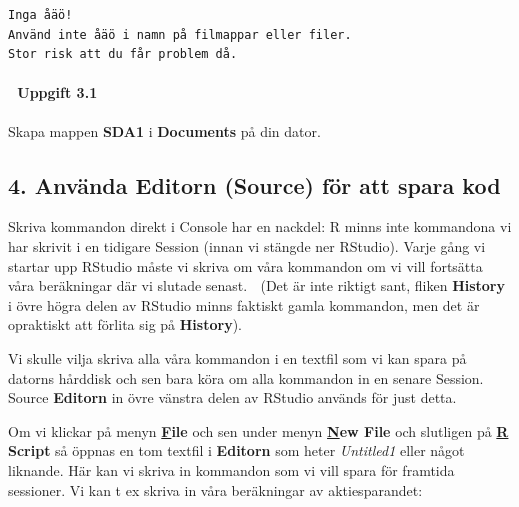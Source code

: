 \documentclass[
  letterpaper,
  DIV=11,
  numbers=noendperiod,
  oneside]{scrartcl}
\let\oldparagraph\paragraph
\renewcommand{\paragraph}[1]{\oldparagraph{#1}\mbox{}}
\begin{document}
\begin{tcolorbox}[enhanced jigsaw, left=2mm, opacityback=0, toprule=.15mm, titlerule=0mm, colframe=quarto-callout-warning-color-frame, rightrule=.15mm, colbacktitle=quarto-callout-warning-color!10!white, toptitle=1mm, leftrule=.75mm, coltitle=black, title=\textcolor{quarto-callout-warning-color}{\faExclamationTriangle}\hspace{0.5em}{Warning}, breakable, bottomtitle=1mm, arc=.35mm, colback=white, bottomrule=.15mm, opacitybacktitle=0.6]

\begin{verbatim}
Inga åäö!
Använd inte åäö i namn på filmappar eller filer.
Stor risk att du får problem då.
\end{verbatim}

\end{tcolorbox}

\hypertarget{uppgift-3.1}{%
\paragraph{💪 Uppgift 3.1}\label{uppgift-3.1}}

Skapa mappen \textbf{SDA1} i \textbf{Documents} på din dator.

\hypertarget{anvuxe4nda-editorn-source-fuxf6r-att-spara-kod}{%
\subsection{4. Använda Editorn (Source) för att spara
kod}\label{anvuxe4nda-editorn-source-fuxf6r-att-spara-kod}}

Skriva kommandon direkt i Console har en nackdel: R minns inte
kommandona vi har skrivit i en tidigare Session (innan vi stängde ner
RStudio). Varje gång vi startar upp RStudio måste vi skriva om våra
kommandon om vi vill fortsätta våra beräkningar där vi slutade senast.
😤 (Det är inte riktigt sant, fliken \textbf{History} i övre högra delen
av RStudio minns faktiskt gamla kommandon, men det är opraktiskt att
förlita sig på \textbf{History}).

Vi skulle vilja skriva alla våra kommandon i en textfil som vi kan spara
på datorns hårddisk och sen bara köra om alla kommandon in en senare
Session. Source \textbf{Editorn} in övre vänstra delen av RStudio
används för just detta.

Om vi klickar på menyn \uline{\textbf{F}}\textbf{ile} och sen under
menyn \uline{\textbf{N}}\textbf{ew File} och slutligen på
\uline{\textbf{R}} \textbf{Script} så öppnas en tom textfil i
\textbf{Editorn} som heter \emph{Untitled1} eller något liknande. Här
kan vi skriva in kommandon som vi vill spara för framtida sessioner. Vi
kan t ex skriva in våra beräkningar av aktiesparandet:
\end{document}
